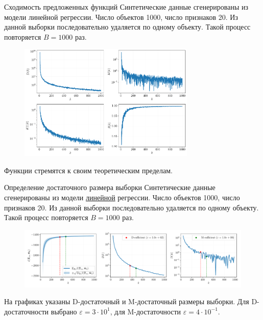 \documentclass[10pt]{beamer}
\begin{document}
\begin{frame}{Сходимость предложенных функций}
    Синтетические данные сгенерированы из модели линейной регрессии. Число объектов 1000, число признаков 20. Из данной выборки последовательно удаляется по одному объекту. Такой процесс повторяется $B=1000$ раз.
    \vfill
    \begin{figure}[h!]
        \centering
        \includegraphics[width=0.75\textwidth]{paper/figures/synthetic-regression-functions.pdf}
    \end{figure}
    \vfill
    Функции стремятся к своим теоретическим пределам.
\end{frame}
\begin{frame}{Определение достаточного размера выборки}
    Синтетические данные сгенерированы из модели \underline{линейной} регрессии. Число объектов 1000, число признаков 20. Из данной выборки последовательно удаляется по одному объекту. Такой процесс повторяется $B=1000$ раз.
    \vfill
    \begin{figure}[h!]
        \centering
        \includegraphics[width=\textwidth]{paper/figures/synthetic-regression-sufficient.pdf}
    \end{figure}
    \vfill
    На графиках указаны D-достаточный и M-достаточный размеры выборки. Для D-достаточности выбрано $\varepsilon = 3 \cdot 10^{1}$, для M-достаточности $\varepsilon = 4 \cdot 10^{-1}$.
\end{frame}
\end{document}
